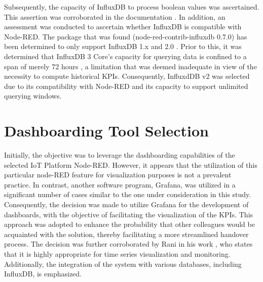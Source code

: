 {Subsequently, the capacity of InfluxDB to process boolean values was ascertained. This assertion was corroborated in the documentation \cite{WriteDataInfluxDB}. In addition, an assessment was conducted to ascertain whether InfluxDB is compatible with Node-RED. The package that was found (node-red-contrib-influxdb 0.7.0) has been determined to only support InfluxDB 1.x and 2.0 \cite{Noderedcontribinfluxdb}. Prior to this, it was determined that InfluxDB 3 Core's capacity for querying data is confined to a span of merely 72 hours \cite{QueryDataGet}, a limitation that was deemed inadequate in view of the necessity to compute historical KPIs. Consequently, InfluxdDB v2 was selected due to its compatibility with Node-RED and its capacity to support unlimited querying windows.

\section{Dashboarding Tool Selection}
Initially, the objective was to leverage the dashboarding capabilities of the selected IoT Platform Node-RED.
However, it appears that the utilization of this particular node-RED feature for visualization purposes is not a prevalent practice. In contrast, another software program, Grafana, was utilized in a significant number of cases similar to the one under consideration in this study. Consequently, the decision was made to utilize Grafana for the development of dashboards, with the objective of facilitating the visualization of the KPIs. This approach was adopted to enhance the probability that other colleagues would be acquainted with the solution, thereby facilitating a more streamlined handover process. The decision was further corroborated by Rani in his work \cite{raniToolsTechniquesRealtime2025}, who states that it is highly appropriate for time series visualization and monitoring. Additionally, the integration of the system with various databases, including InfluxDB, is emphasized.

}
